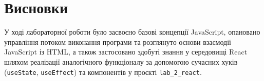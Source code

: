 \documentclass[12pt, a4paper]{article}
\begin{document}
\section{Висновки}
У ході лабораторної роботи було засвоєно базові концепції JavaScript, опановано управління потоком виконання програми та розглянуто основи взаємодії JavaScript із HTML, а також застосовано здобуті знання у середовищі React шляхом реалізації аналогічного функціоналу за допомогою сучасних хуків (\verb|useState|, \verb|useEffect|) та компонентів у проєкті \verb|lab_2_react|.
\end{document}
